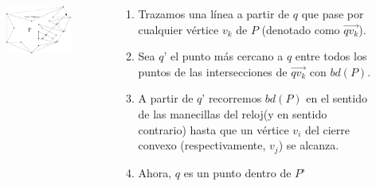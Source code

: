 \documentclass[aspectratio=169,xcolor=dvipsnames, t]{beamer}
\begin{document}
\begin{frame}{}
    \begin{columns}
    \begin{column}{0.45\textwidth}
        \begin{figure}
            \centering
            \includegraphics[width=1.1\textwidth]{imagenes/Caso02.png}
        \end{figure}
    \end{column}
    \begin{column}{0.45\textwidth}  %
        \begin{enumerate}
        \footnotesize
            \item Trazamos una línea a partir de $q$ que pase por cualquier vértice $v_{k}$ de $P$ (denotado como $\overrightarrow{qv_{k}}$). 
            \item Sea $q’$ el punto más cercano a $q$ entre todos los puntos de las intersecciones de $\overrightarrow{qv_{k}}$ con $bd(P)$. 
            \item A partir de $q’$ recorremos $bd(P)$ en el sentido de las manecillas del reloj(y en sentido contrario) hasta que un vértice $v_{i}$ del cierre convexo (respectivamente, $v_{j}$) se alcanza.
            \item  Ahora, $q$ es un punto dentro de $P’$
        \end{enumerate}
    \end{column}
    \end{columns}
\end{frame}
\end{document}
